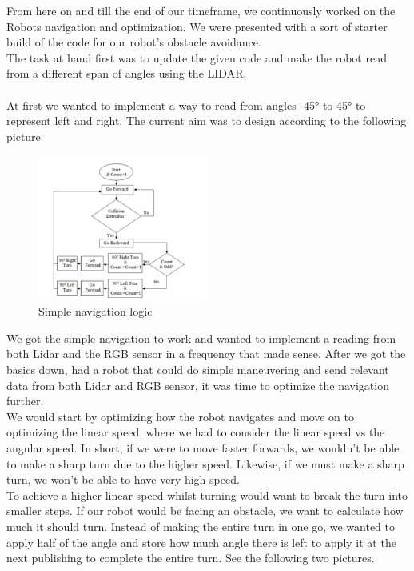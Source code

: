 \documentclass[conference]{IEEEtran}
\begin{document}
From here on and till the end of our timeframe, we continuously worked on the Robots navigation and optimization.
We were presented with a sort of starter build of the code \cite{b5} for our robot's obstacle avoidance.\\
The task at hand first was to update the given code and make the robot read from a different 
span of angles using the LIDAR. \\
\vspace*{2pt}\\
At first we wanted to implement a way to read from angles -45° to 45° to 
represent left and right. The current aim was to design according to the following picture\cite{b6}
\begin{figure}[h] %
    \centering
    \includegraphics[width=0.5\textwidth]{initialNav.png}
    \caption{Simple navigation logic}
\end{figure} 
We got the simple navigation to work and wanted to implement a reading from both Lidar and the RGB sensor 
in a frequency that made sense. After we got the basics down, had a robot that could do simple maneuvering 
and send relevant data from both Lidar and RGB sensor, it was time to optimize the navigation further.\\
We would start by optimizing how the robot navigates and move on to optimizing the linear speed, where we had 
to consider the linear speed vs the angular speed. In short, if we were to move faster forwards, we wouldn't be 
able to make a sharp turn due to the higher speed. Likewise, if we must make a sharp turn, we won't be able to have 
very high speed.\\
To achieve a higher linear speed whilst turning would want to break the turn into smaller steps. 
If our robot would be facing an obstacle, we want to calculate how much it should turn. Instead of making 
the entire turn in one go, we wanted to apply half of the angle and store how much angle there is left 
to apply it at the next publishing to complete the entire turn. See the following two pictures. \cite{b7}\\
\end{document}
